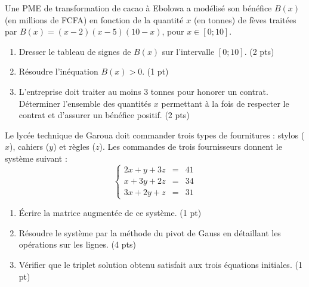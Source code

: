 \documentclass[11pt]{article}
\begin{document}
\begin{exercice}
Une PME de transformation de cacao à Ebolowa a modélisé son bénéfice $B(x)$ (en millions de FCFA) en fonction de la quantité $x$ (en tonnes) de fèves traitées par $B(x) = (x-2)(x-5)(10-x)$, pour $x \in [0; 10]$.
\begin{enumerate}
    \item Dresser le tableau de signes de $B(x)$ sur l'intervalle $[0; 10]$. (2 pts)
    \item Résoudre l'inéquation $B(x) > 0$. (1 pt)
    \item L'entreprise doit traiter au moins $3$ tonnes pour honorer un contrat. Déterminer l'ensemble des quantités $x$ permettant à la fois de respecter le contrat et d'assurer un bénéfice positif. (2 pts)
\end{enumerate}
\end{exercice}

\begin{exercice}
Le lycée technique de Garoua doit commander trois types de fournitures : stylos ($x$), cahiers ($y$) et règles ($z$). Les commandes de trois fournisseurs donnent le système suivant :
\[
\left\{
\begin{array}{rcl}
2x + y + 3z &=& 41 \\
x + 3y + 2z &=& 34 \\
3x + 2y + z &=& 31
\end{array}
\right.
\]
\begin{enumerate}
    \item Écrire la matrice augmentée de ce système. (1 pt)
    \item Résoudre le système par la méthode du pivot de Gauss en détaillant les opérations sur les lignes. (4 pts)
    \item Vérifier que le triplet solution obtenu satisfait aux trois équations initiales. (1 pt)
\end{enumerate}
\end{exercice}
\end{document}
